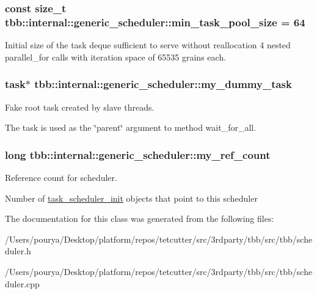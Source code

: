 \subsubsection[{min\+\_\+task\+\_\+pool\+\_\+size}]{\setlength{\rightskip}{0pt plus 5cm}const size\+\_\+t tbb\+::internal\+::generic\+\_\+scheduler\+::min\+\_\+task\+\_\+pool\+\_\+size = 64\hspace{0.3cm}{\ttfamily [static]}}\label{classtbb_1_1internal_1_1generic__scheduler_a1190ee0529a9280846bd50c4f50c8398}
Initial size of the task deque sufficient to serve without reallocation 4 nested parallel\+\_\+for calls with iteration space of 65535 grains each. \hypertarget{classtbb_1_1internal_1_1generic__scheduler_abc495d5b077a2ef1b05e15e820555d90}{}
\subsubsection[{my\+\_\+dummy\+\_\+task}]{\setlength{\rightskip}{0pt plus 5cm}task$\ast$ tbb\+::internal\+::generic\+\_\+scheduler\+::my\+\_\+dummy\+\_\+task}\label{classtbb_1_1internal_1_1generic__scheduler_abc495d5b077a2ef1b05e15e820555d90}


Fake root task created by slave threads. 

The task is used as the \char`\"{}parent\char`\"{} argument to method wait\+\_\+for\+\_\+all. \hypertarget{classtbb_1_1internal_1_1generic__scheduler_a8cf8d776a439320e1e001381cf5d4ad7}{}
\subsubsection[{my\+\_\+ref\+\_\+count}]{\setlength{\rightskip}{0pt plus 5cm}long tbb\+::internal\+::generic\+\_\+scheduler\+::my\+\_\+ref\+\_\+count}\label{classtbb_1_1internal_1_1generic__scheduler_a8cf8d776a439320e1e001381cf5d4ad7}


Reference count for scheduler. 

Number of \hyperlink{classtbb_1_1task__scheduler__init}{task\+\_\+scheduler\+\_\+init} objects that point to this scheduler 

The documentation for this class was generated from the following files\+:\begin{DoxyCompactItemize}
\item 
/\+Users/pourya/\+Desktop/platform/repos/tetcutter/src/3rdparty/tbb/src/tbb/scheduler.\+h\item 
/\+Users/pourya/\+Desktop/platform/repos/tetcutter/src/3rdparty/tbb/src/tbb/scheduler.\+cpp\end{DoxyCompactItemize}
